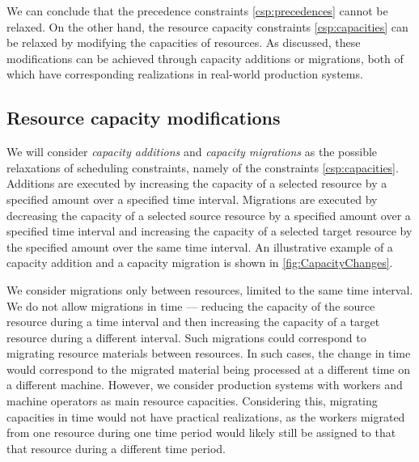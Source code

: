 We can conclude that the precedence constraints \eqref{csp:precedences} cannot be relaxed.
On the other hand, the resource capacity constraints \eqref{csp:capacities}
can be relaxed by modifying the capacities of resources.
As discussed,
these modifications can be achieved through capacity additions or migrations,
both of which have corresponding realizations in real-world production systems.

\subsection{Resource capacity modifications} \label{subsec:problem-statement/bottlenecks/resource-capacity-modifications}

We will consider \emph{capacity additions} and \emph{capacity migrations} as the possible relaxations
of scheduling constraints, namely of the constraints \eqref{csp:capacities}.
Additions are executed by increasing the capacity of a selected resource
by a specified amount over a specified time interval.
Migrations are executed by decreasing the capacity of a selected source resource
by a specified amount over a specified time interval
and increasing the capacity of a selected target resource
by the specified amount over the same time interval.
An illustrative example of a capacity addition and a capacity migration is shown in \cref{fig:CapacityChanges}.

We consider migrations only between resources, limited to the same time interval.
We do not allow migrations in time ---
reducing the capacity of the source resource during a time interval
and then increasing the capacity of a target resource during a different interval.
Such migrations could correspond to migrating resource materials between resources.
In such cases, the change in time would correspond to the migrated material
being processed at a different time on a different machine.
However, we consider production systems with workers and machine operators as main resource capacities.
Considering this, migrating capacities in time would not have practical realizations,
as the workers migrated from one resource during one time period
would likely still be assigned to that that resource during a different time period.


